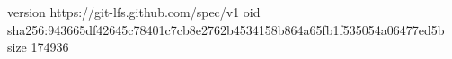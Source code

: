 version https://git-lfs.github.com/spec/v1
oid sha256:943665df42645c78401c7cb8e2762b4534158b864a65fb1f535054a06477ed5b
size 174936
